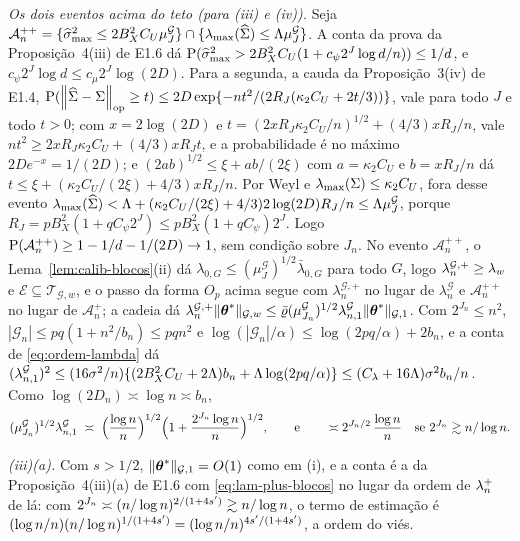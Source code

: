 \documentclass[11pt,a4paper]{article}
\newcommand{\lmaxx}{\lambda_{\max}}
\newcommand{\smax}{\widehat{\sigma}_{\max}}
\newcommand{\opnorm}[1]{\left\lVert #1 \right\rVert_{\mathrm{op}}}
\newcommand{\Gcal}{\mathcal{G}}
\newcommand{\bn}{b_{n}}
\newcommand{\nGw}[1]{\lVert #1\rVert_{\mathcal{G},w}}
\newcommand{\nGone}[1]{\lVert #1\rVert_{\mathcal{G},1}}
\newcommand{\lamG}{\lambda^{\mathcal{G}}_{n}}
\newcommand{\lamGone}{\lambda^{\mathcal{G}}_{n,1}}
\newcommand{\lamGp}{\lambda^{\mathcal{G},+}_{n}}   %
\newcommand{\lamz}[1]{\lambda_{0,#1}}
\newcommand{\lamzbar}[1]{\bar{\lambda}_{0,#1}}
\newcommand{\Tw}{\mathcal{T}_{\mathcal{G},w}}
\newcommand{\Ecal}{\mathcal{E}}
\newcommand{\Acal}{\mathcal{A}_{n}}
\begin{document}
\emph{Os dois eventos acima do teto (para (iii) e (iv)).} Seja $\Acal^{++} =
\{\smax^{2} \le 2B_{X}^{2}C_{U}\mu^{\Gcal}_{J}\} \cap \{\lmaxx(\Gramhat) \le
\Lambda\mu^{\Gcal}_{J}\}$. A conta da prova da Proposição~4(iii) de E1.6 dá
$\Prob(\smax^{2} > 2B_{X}^{2}C_{U}(1 + c_{\psi}2^{J}\log d/n)) \le 1/d$, e
$c_{\psi}2^{J}\log d \le c_{\mu}2^{J}\log(2D)$. Para a segunda, a cauda da
Proposição~3(iv) de E1.4, $\Prob(\opnorm{\Gramhat - \Gram} \ge t) \le
2D\exp\{-nt^{2}/(2R_{J}(\kappa_{2}C_{U} + 2t/3))\}$, vale para todo $J$ e
todo $t > 0$; com $x = 2\log(2D)$ e $t = (2xR_{J}\kappa_{2}C_{U}/n)^{1/2} +
(4/3)xR_{J}/n$, vale $nt^{2} \ge 2xR_{J}\kappa_{2}C_{U} + (4/3)xR_{J}t$, e a
probabilidade é no máximo $2De^{-x} = 1/(2D)$; e $(2ab)^{1/2} \le \xi +
ab/(2\xi)$ com $a = \kappa_{2}C_{U}$ e $b = xR_{J}/n$ dá $t \le \xi +
(\kappa_{2}C_{U}/(2\xi) + 4/3)xR_{J}/n$. Por Weyl e
$\lmaxx(\Gram) \le \kappa_{2}C_{U}$, fora desse evento
$\lmaxx(\Gramhat) < \Lambda + (\kappa_{2}C_{U}/(2\xi) + 4/3)
2\log(2D)R_{J}/n \le \Lambda\mu^{\Gcal}_{J}$, porque $R_{J} =
pB_{X}^{2}(1 + qC_{\psi}2^{J}) \le pB_{X}^{2}(1+qC_{\psi})2^{J}$. Logo
$\Prob(\Acal^{++}) \ge 1 - 1/d - 1/(2D) \to 1$, sem condição sobre $J_{n}$.
No evento $\Acal^{++}$, o Lema~\ref{lem:calib-blocos}(ii) dá $\lamz{G} \le
(\mu^{\Gcal}_{J})^{1/2}\lamzbar{G}$ para todo $G$, logo $\lamGp \ge
\pen_{w}$ e $\Ecal \subseteq \Tw$, e o passo da forma $O_{p}$ acima segue com
$\lamGp$ no lugar de $\lamG$ e $\Acal^{++}$ no lugar de $\Acal^{+}$; a cadeia
dá $\lamGp\nGw{\thetastar} \le \bar\varrho(\mu^{\Gcal}_{J_{n}})^{1/2}
\lamGone\nGone{\thetastar}$. Com $2^{J_{n}} \le n^{2}$, $|\Gcal_{n}| \le pq(1 +
n^{2}/\bn) \le pqn^{2}$ e $\log(|\Gcal_{n}|/\alpha) \le \log(2pq/\alpha) +
2\bn$, e a conta de \eqref{eq:ordem-lambda} dá $(\lamGone)^{2} \le
(16\sigma^{2}/n)\{(2B_{X}^{2}C_{U} + 2\Lambda)\bn + \Lambda\log(2pq/\alpha)\}
\le (C_{\pen} + 16\Lambda)\sigma^{2}\bn/n$. Como $\log(2D_{n}) \asymp \log n
\asymp \bn$,
\begin{equation}
  \label{eq:lam-plus-blocos}
  (\mu^{\Gcal}_{J_{n}})^{1/2}\lamGone \;\asymp\;
  \Bigl(\frac{\log n}{n}\Bigr)^{1/2}\Bigl(1 + \frac{2^{J_{n}}\log n}{n}\Bigr)^{1/2},
  \qquad\text{e}\qquad
  \asymp 2^{J_{n}/2}\,\frac{\log n}{n}\quad\text{se } 2^{J_{n}} \gtrsim n/\log n .
\end{equation}

\emph{(iii)(a).} Com $s > 1/2$, $\nGone{\thetastar} = O(1)$ como em (i), e a
conta é a da Proposição~4(iii)(a) de E1.6 com
\eqref{eq:lam-plus-blocos} no lugar da ordem de $\lambda_{n}^{+}$ de lá: com
$2^{J_{n}} \asymp (n/\log n)^{2/(1+4s')} \gtrsim n/\log n$, o termo de
estimação é $(\log n/n)(n/\log n)^{1/(1+4s')} =
(\log n/n)^{4s'/(1+4s')}$, a ordem do viés.
\end{document}
